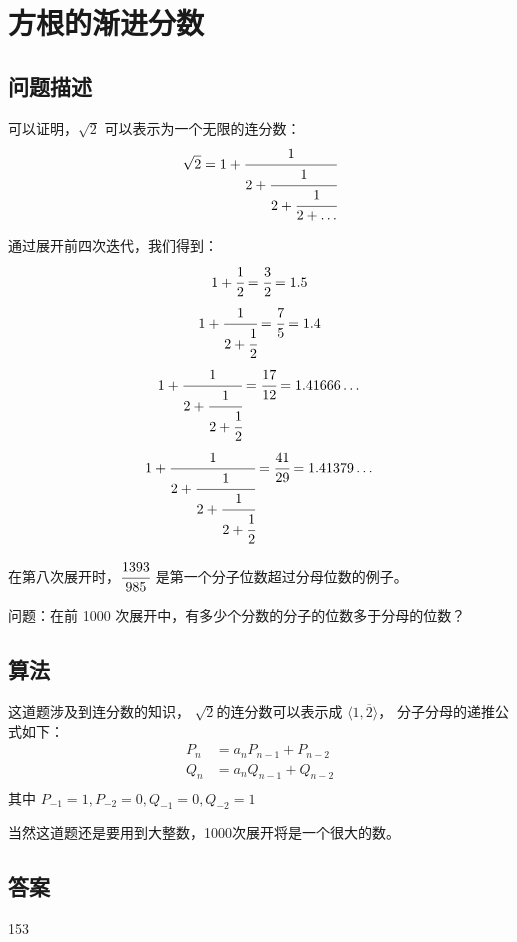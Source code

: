 \section{方根的渐进分数}\label{sec:problem57}
\subsection{问题描述}
\begin{tcolorbox}
	可以证明，$\sqrt{2}$ 可以表示为一个无限的连分数：
	\[
		\sqrt{2} = 1 + \cfrac{1}{2 + \cfrac{1}{2 + \cfrac{1}{2 + \dots}}}
	\]

	通过展开前四次迭代，我们得到：
	\[
		1 + \cfrac{1}{2} = \cfrac{3}{2} = 1.5
	\]
	\[
		1 + \cfrac{1}{2 + \cfrac{1}{2}} = \cfrac{7}{5} = 1.4
	\]
	\[
		1 + \cfrac{1}{2 + \cfrac{1}{2 + \cfrac{1}{2}}} = \cfrac{17}{12} = 1.41666 \dots
	\]
	\[
		1 + \cfrac{1}{2 + \cfrac{1}{2 + \cfrac{1}{2 + \cfrac{1}{2}}}} = \cfrac{41}{29} = 1.41379 \dots
	\]

	在第八次展开时，$\cfrac{1393}{985}$ 是第一个分子位数超过分母位数的例子。

	问题：在前 1000 次展开中，有多少个分数的分子的位数多于分母的位数？
\end{tcolorbox}

\subsection{算法}
这道题涉及到连分数的知识， $ \sqrt{2} $的连分数可以表示成 $ \langle 1, \overline{2} \rangle $， 分子分母的递推公式如下：
\begin{align*}
	P_n & = a_nP_{n-1} + P_{n-2} \\
	Q_n & = a_nQ_{n-1} + Q_{n-2} \\
\end{align*}
其中 \( P_{-1} = 1, P_{-2} = 0, Q_{-1} = 0, Q_{-2} = 1 \)

当然这道题还是要用到大整数，1000次展开将是一个很大的数。

\subsection{答案}
153
